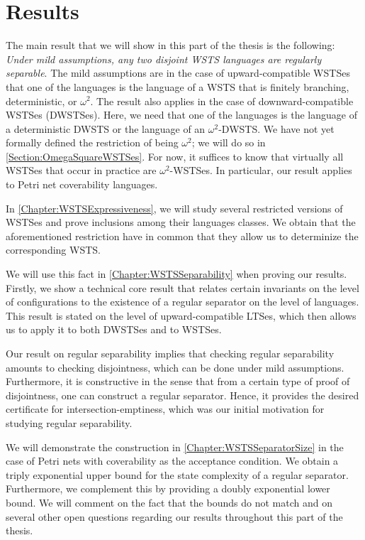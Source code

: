 \documentclass[../../diss.tex]{subfiles}
\begin{document}
\section{Results}%
\label{Separability:Results}

The main result that we will show in this part of the thesis is the following:
\emph{Under mild assumptions, any two disjoint WSTS languages are regularly separable}.
The mild assumptions are in the case of upward-compatible WSTSes that one of the languages is the language of a WSTS that is finitely branching, deterministic, or $\omega^2$.
The result also applies in the case of downward-compatible WSTSes (DWSTSes).
Here, we need that one of the languages is the language of a deterministic DWSTS or the language of an $\omega^2$-DWSTS.\@
We have not yet formally defined the restriction of being $\omega^2$; we will do so in \cref{Section:OmegaSquareWSTSes}.
For now, it suffices to know that virtually all WSTSes that occur in practice are $\omega^2$-WSTSes.
In particular, our result applies to Petri net coverability languages.

In \cref{Chapter:WSTSExpressiveness}, we will study several restricted versions of WSTSes and prove inclusions among their languages classes.
We obtain that the aforementioned restriction have in common that they allow us to determinize the corresponding WSTS.\@

We will use this fact in \cref{Chapter:WSTSSeparability} when proving our results.
Firstly, we show a technical core result that relates certain invariants on the level of configurations to the existence of a regular separator on the level of languages.
This result is stated on the level of upward-compatible LTSes, which then allows us to apply it to both DWSTSes and to WSTSes.

Our result on regular separability implies that checking regular separability amounts to checking disjointness, which can be done under mild assumptions.
Furthermore, it is constructive in the sense that from a certain type of proof of disjointness, one can construct a regular separator.
Hence, it provides the desired certificate for intersection-emptiness, which was our initial motivation for studying regular separability.

We will demonstrate the construction in \cref{Chapter:WSTSSeparatorSize} in the case of Petri nets with coverability as the acceptance condition.
We obtain a triply exponential upper bound for the state complexity of a regular separator.
Furthermore, we complement this by providing a doubly exponential lower bound.
We will comment on the fact that the bounds do not match and on several other open questions regarding our results throughout this part of the thesis.
\end{document}
